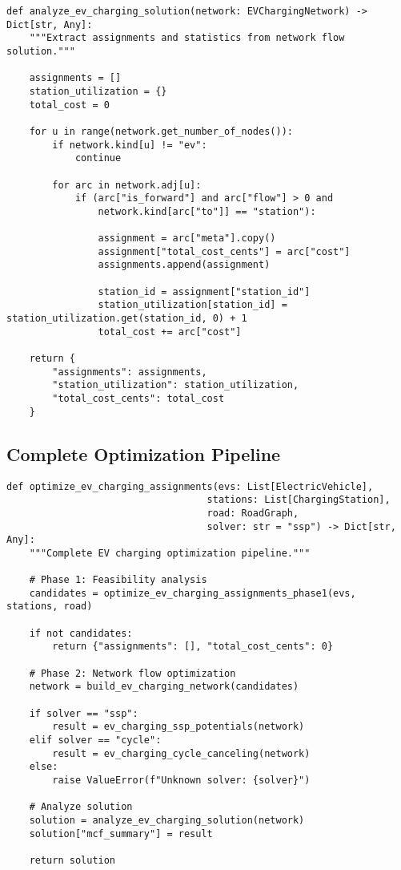 \documentclass[12pt,a4paper]{article}
\begin{document}
\begin{lstlisting}[caption=Solution Analysis]
def analyze_ev_charging_solution(network: EVChargingNetwork) -> Dict[str, Any]:
    """Extract assignments and statistics from network flow solution."""
    
    assignments = []
    station_utilization = {}
    total_cost = 0
    
    for u in range(network.get_number_of_nodes()):
        if network.kind[u] != "ev":
            continue
            
        for arc in network.adj[u]:
            if (arc["is_forward"] and arc["flow"] > 0 and 
                network.kind[arc["to"]] == "station"):
                
                assignment = arc["meta"].copy()
                assignment["total_cost_cents"] = arc["cost"]
                assignments.append(assignment)
                
                station_id = assignment["station_id"]
                station_utilization[station_id] = station_utilization.get(station_id, 0) + 1
                total_cost += arc["cost"]
    
    return {
        "assignments": assignments,
        "station_utilization": station_utilization,
        "total_cost_cents": total_cost
    }
\end{lstlisting}

\subsection{Complete Optimization Pipeline}

\begin{lstlisting}[caption=Main Optimization Function]
def optimize_ev_charging_assignments(evs: List[ElectricVehicle],
                                   stations: List[ChargingStation],
                                   road: RoadGraph,
                                   solver: str = "ssp") -> Dict[str, Any]:
    """Complete EV charging optimization pipeline."""
    
    # Phase 1: Feasibility analysis
    candidates = optimize_ev_charging_assignments_phase1(evs, stations, road)
    
    if not candidates:
        return {"assignments": [], "total_cost_cents": 0}
    
    # Phase 2: Network flow optimization
    network = build_ev_charging_network(candidates)
    
    if solver == "ssp":
        result = ev_charging_ssp_potentials(network)
    elif solver == "cycle":
        result = ev_charging_cycle_canceling(network)
    else:
        raise ValueError(f"Unknown solver: {solver}")
    
    # Analyze solution
    solution = analyze_ev_charging_solution(network)
    solution["mcf_summary"] = result
    
    return solution
\end{lstlisting}
\end{document}
